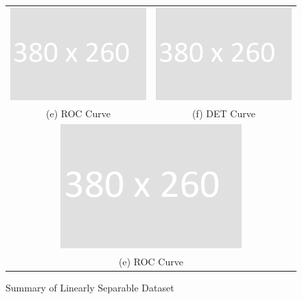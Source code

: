 \begin{figure}[h!]
\begin{tabular}{cc}
		\includegraphics[width=70mm]{dummy.png} &   \includegraphics[width=70mm]{dummy.png} \\
		(e) ROC Curve & (f) DET Curve \\[4pt]		
		
		
		
		\multicolumn{2}{c}{\includegraphics[width=70mm]{dummy.png} }\\
		\multicolumn{2}{c}{(e) ROC Curve}
		
	\end{tabular}\hspace*{-1cm}
	\caption{Summary of Linearly Separable Dataset}
\end{figure}